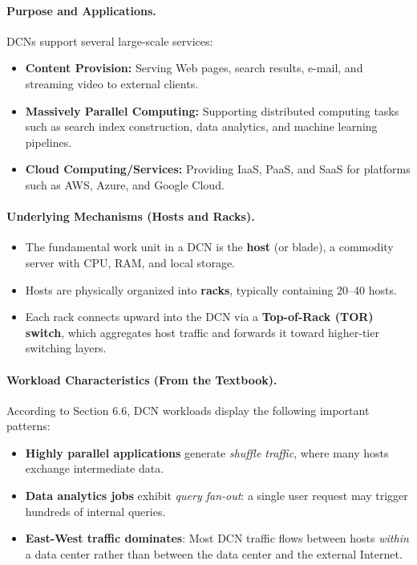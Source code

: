 \documentclass[12pt]{article}
\begin{document}
\paragraph*{Purpose and Applications.}
DCNs support several large-scale services:
\begin{itemize}
    \item \cite{13886} \textbf{Content Provision:} Serving Web pages, search results, e-mail, and streaming video to external clients.
    \item \cite{13886} \textbf{Massively Parallel Computing:} Supporting distributed computing tasks such as search index construction, data analytics, and machine learning pipelines.
    \item \cite{13886} \textbf{Cloud Computing/Services:} Providing IaaS, PaaS, and SaaS for platforms such as AWS, Azure, and Google Cloud.
\end{itemize}

\paragraph*{Underlying Mechanisms (Hosts and Racks).}
\begin{itemize}
    \item \cite{13886} The fundamental work unit in a DCN is the \textbf{host} (or blade), a commodity server with CPU, RAM, and local storage.
    \item \cite{13886} Hosts are physically organized into \textbf{racks}, typically containing 20--40 hosts.
    \item Each rack connects upward into the DCN via a \textbf{Top-of-Rack (TOR) switch}, which aggregates host traffic and forwards it toward higher-tier switching layers.
\end{itemize}

\paragraph*{Workload Characteristics (From the Textbook).}
According to Section 6.6, DCN workloads display the following important patterns:
\begin{itemize}
    \item \textbf{Highly parallel applications} generate \emph{shuffle traffic}, where many hosts exchange intermediate data.
    \item \textbf{Data analytics jobs} exhibit \emph{query fan-out}: a single user request may trigger hundreds of internal queries.
    \item \textbf{East-West traffic dominates}: Most DCN traffic flows between hosts \emph{within} a data center rather than between the data center and the external Internet.
\end{itemize}
\end{document}
